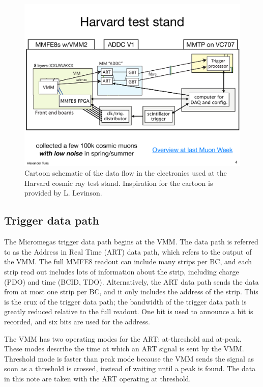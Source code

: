 \begin{figure}[!htpb]
  \begin{center}
    \includegraphics[width=1.0\textwidth]{figures/cartoons/electronics_path.pdf}
  \end{center}
  \vspace{-20pt}
  \caption{Cartoon schematic of the data flow in the electronics used at the Harvard cosmic ray test stand. Inspiration for the cartoon is provided by L. Levinson.}
  \label{fig:cartoon_elx}
\end{figure}

\subsection{Trigger data path}
\label{sec:exp-art}

The Micromegas trigger data path begins at the VMM. The data path is referred to as the Address in Real Time (ART) data path, which refers to the output of the VMM. The full MMFE8 readout can include many strips per BC, and each strip read out includes lots of information about the strip, including charge (PDO) and time (BCID, TDO). Alternatively, the ART data path sends the data from at most one strip per BC, and it only includes the address of the strip. This is the crux of the trigger data path; the bandwidth of the trigger data path is greatly reduced relative to the full readout. One bit is used to announce a hit is recorded, and six bits are used for the address.

The VMM has two operating modes for the ART: at-threshold and at-peak. These modes describe the time at which an ART signal is sent by the VMM. Threshold mode is faster than peak mode because the VMM sends the signal as soon as a threshold is crossed, instead of waiting until a peak is found. The data in this note are taken with the ART operating at threshold.

